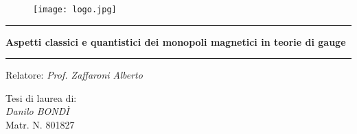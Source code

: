 \begin{titlepage}


\vspace{0.5cm}

\begin{figure}[h]
\centering
\texttt{[image: logo.jpg]}
\end{figure}

\vspace{2cm}
\hrule
\vspace{0.5cm}

\centering\huge\textbf{
   Aspetti classici e quantistici dei monopoli magnetici in teorie di gauge}

\vspace{0.5cm}
\hrule
\vspace{2cm}

\large
\raggedright Relatore: \emph{Prof. Zaffaroni Alberto} \par
\begin{table}[h]
\large
	Tesi di laurea di: \\
	\emph{Danilo BONDÌ} \\
	Matr. N. 801827\\
\end{table}

\vspace{1cm}
\large
\vfill{}

\end{titlepage}



 		\setcounter{page}{2}
         \null
         \thispagestyle{empty}
         \newpage

\tableofcontents

\newpage

